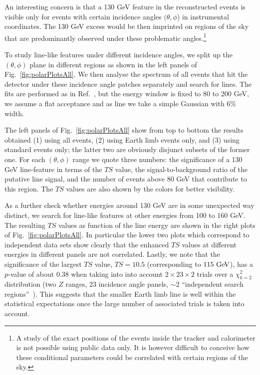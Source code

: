 \documentclass[aps,twocolumn,prd,superscriptaddress,showpacs,nofootinbib,fixfloat]{revtex4}
\newcommand{\GeV}{{\rm ~GeV}}
\begin{document}

An interesting concern is that a 130 GeV feature in the
reconstructed events is visible only for events with certain
incidence angles $(\theta, \phi$) in instrumental
coordinates. The 130 GeV excess would be then imprinted on
regions of the sky that are predominantly observed under
these problematic angles.\footnote{A study of the exact
positions of the events inside the tracker and calorimeter
is not possible using public data only.
It is however difficult to conceive how these conditional
parameters could be correlated with certain regions of the
sky.}

To study line-like features under different incidence
angles, we split up the $(\theta, \phi)$ plane in different
regions as shown in the left panels of
Fig.~\ref{fig:polarPlotsAll}. We then analyse the spectrum
of all events that hit the detector under these incidence
angle patches separately and search for lines. The fits are
performed as in Ref.~\cite{Weniger:2012}, but the energy
window is fixed to 80 to 200 GeV, we assume a flat
acceptance and as line we take a simple Gaussian with $6\%$
width.

The left panels of Fig.~\ref{fig:polarPlotsAll} show from
top to bottom the results obtained (1) using all events, (2)
using Earth limb events only, and (3) using standard events
only; the latter two are obviously disjunct subsets of the
former one. For each $(\theta, \phi)$ range we quote three
numbers: the significance of a 130 GeV line-feature in terms
of the $TS$ value, the signal-to-background ratio of the
putative line signal, and the number of events above 80 GeV
that contribute to this region. The $TS$ values are also
shown by the colors for better visibility.


As a further check whether energies around 130 GeV are in
some unexpected way distinct, we search for line-like
features at other energies from 100 to 160 GeV. The
resulting $TS$ values as function of the line energy are
shown in the right plots of Fig.~\ref{fig:polarPlotsAll}. In
particular the lower two plots which correspond to
independent data sets show clearly that the enhanced $TS$
values at different energies in different panels are not
correlated. Lastly, we note that the significance of the
largest $TS$ value, $TS=10.5$ (corresponding to $115\GeV$), has a $p$-value of
about $0.38$ when taking into into account
$2\times23\times2$ trials over a $\chi_{k=2}^2$ distribution
(two $Z$ ranges, $23$ incidence angle panels, $\sim2$
``independent search regions''~\cite{Vittels}). This
suggests that the smaller Earth limb line is well within the
statistical expectations once the large number of associated
trials is taken into account.
\end{document}
